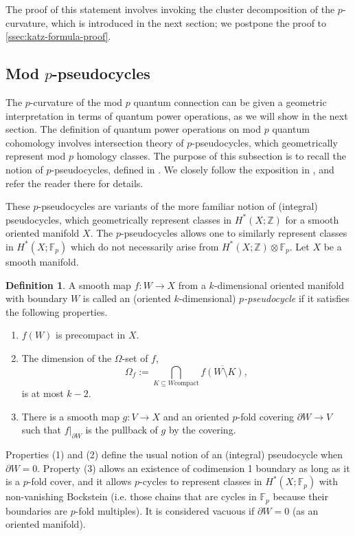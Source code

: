 \documentclass[reqno]{amsart}
\numberwithin{equation}{section}
\numberwithin{equation}{section}
\numberwithin{equation}{section}
\theoremstyle{definition}
\newtheorem{defn}[thm]{Definition}
\theoremstyle{remark}
\theoremstyle{remark}
\newcommand{\ov}{\overline}
\begin{document}
The proof of this statement involves invoking the cluster decomposition of the $p$-curvature, which is introduced in the next section; we postpone the proof to \cref{ssec:katz-formula-proof}.

\subsection{Mod $p$-pseudocycles}\label{subsec:p-pseudocycles}
The $p$-curvature of the mod $p$ quantum connection can be given a geometric interpretation in terms of quantum power operations, as we will show in the next section. The definition of quantum power operations on mod $p$ quantum cohomology involves intersection theory of $p$-pseudocycles, which geometrically represent mod $p$ homology classes. The purpose of this subsection is to recall the notion of $p$-pseudocycles, defined in \cite[Appendix A]{Wil-sur}. We closely follow the exposition in \cite[Appendix A]{bai-pomerleano-xu}, and refer the reader there for details.

These $p$-pseudocycles are variants of the more familiar notion of (integral) pseudocycles, which geometrically represent classes in $H^*(X;\mathbb{Z})$ for a smooth oriented manifold $X$. The $p$-pseudocycles allows one to similarly represent classes in $H^*(X;\mathbb{F}_p)$ which do not necessarily arise from $H^*(X;\mathbb{Z}) \otimes \mathbb{F}_p$. 
Let $X$ be a smooth manifold.
\begin{defn}
    A smooth map $f: W \to X$ from a $k$-dimensional oriented manifold with boundary $W$ is called an (oriented $k$-dimensional) \emph{$p$-pseudocycle} if it satisfies the following properties.
    \begin{enumerate}
        \item $f(W)$ is precompact in $X$.
        \item The dimension of the $\Omega$-set of $f$,
        \begin{equation}
            \Omega_f := \bigcap_{K \subseteq W \mathrm{compact}} \ov{f(W\setminus K)},
        \end{equation}
        is at most $k-2$.
        
        \item There is a smooth map $g: V \to X$ and an oriented $p$-fold covering $\partial W \to V$ such that $f|_{\partial W}$ is the pullback of $g$ by the covering.
    \end{enumerate}
\end{defn}
Properties (1) and (2) define the usual notion of an (integral) pseudocycle when $\partial W = 0$. Property (3) allows an existence of codimension 1 boundary as long as it is a $p$-fold cover, and it allows $p$-cycles to represent classes in $H^*(X;\mathbb{F}_p)$ with non-vanishing Bockstein (i.e. those chains that are cycles in $\mathbb{F}_p$ because their boundaries are $p$-fold multiples). It is considered vacuous if $\partial W = 0$ (as an oriented manifold).
\end{document}
